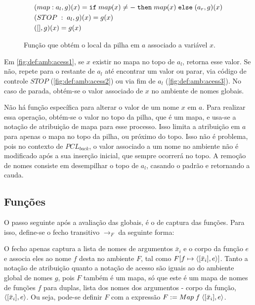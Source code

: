 \begin{figure}[ht]
	\begin{align}
		&(map : a_l, g)(x) = \texttt{if}\; map(x) \neq - \;\texttt{then}\; map(x) \;\texttt{else}\; (a_r, g)(x)\label{fig:def:amb:acess1}\\
		&(STOP \;:\;a_l, g)(x) = g(x) \label{fig:def:amb:acess2}\\
		&([], g)(x) = g(x)\label{fig:def:amb:acess3}
	\end{align}
	\caption{Função que obtém o local da pilha em $a$ associado a variável $x$. }
	\label{fig:def:amb:acess}
\end{figure}

Em \ref{fig:def:amb:acess1}, se $x$ existir no mapa no topo de $a_l$, retorna esse valor. Se não, repete para o restante de $a_l$ até encontrar um valor ou parar, via código de controle $STOP$ (\ref{fig:def:amb:acess2}) ou via fim de $a_l$ (\ref{fig:def:amb:acess3}). No caso de parada, obtém-se o valor associado de $x$ no ambiente de nomes globais.

Não há função específica para alterar o valor de um nome $x$ em $a$. Para realizar essa operação, obtém-se o valor no topo da pilha, que é um mapa, e usa-se a notação de atribuição de mapa para esse processo. Isso limita a atribuição em $a$ para apenas o mapa no topo da pilha, ou próximo do topo. Isso não é problema, pois no contexto de $PCL_{back}$, o valor associado a um nome no ambiente não é modificado após a sua inserção inicial, que sempre ocorrerá no topo. A remoção de nomes consiste em desempilhar o topo de $a_l$, casando o padrão e retornando a cauda.

\subsection{Funções}

O passo seguinte após a avaliação das globais, é o de captura das funções. Para isso, define-se o fecho transitivo $\to_F$ da seguinte forma:

\noindent O fecho apenas captura a lista de nomes de argumentos $\bar x_i$ e o corpo da função $e$ e associa eles ao nome $f$ desta no ambiente $F$, tal como $F[f \mapsto \langle [\bar x_i], e \rangle]$. Tanto a notação de atribuição quanto a notação de acesso são iguais ao do ambiente global de nomes $g$, pois $F$ também é um mapa, só que este é um mapa de nomes de funções $f$ para duplas, lista dos nomes dos argumentos - corpo da função, $\langle [\bar x_i], e \rangle$. Ou seja, pode-se definir $F$ com a expressão $F := Map\;f\; \langle [\bar x_i], e \rangle$.

